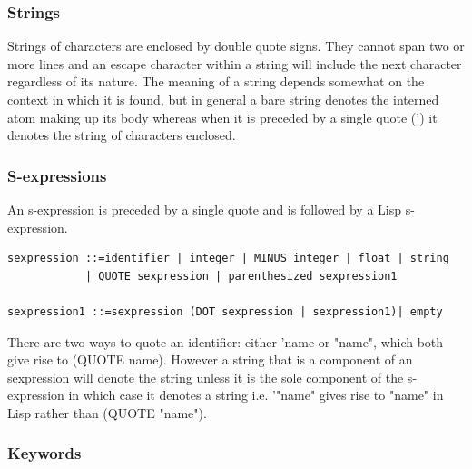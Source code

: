 \documentclass{article}
\begin{document}
\subsubsection{Strings}
\label{sec:boot:string}

Strings of characters are enclosed by double quote signs. They cannot
span two or more lines and an escape character within a string will
include the next character regardless of its nature.
The meaning of a string depends somewhat on the context in which
it is found, but in general a bare string denotes the interned atom
making up its body whereas when it is preceded by a single quote (')
it denotes the string of characters enclosed.

\subsubsection{S-expressions}
\label{sec:boot:s-expression}

An s-expression is preceded by a single quote and is followed by
a Lisp s-expression.
\begin{verbatim}
sexpression ::=identifier | integer | MINUS integer | float | string
            | QUOTE sexpression | parenthesized sexpression1

sexpression1 ::=sexpression (DOT sexpression | sexpression1)| empty
\end{verbatim}

There are two ways to quote an identifier: either 'name or "name", which
both give rise to (QUOTE name). However a string that is a
component of an sexpression will denote the string unless it is the
sole component of the s-expression in which case it denotes a string
i.e. '"name" gives rise to "name" in Lisp rather than (QUOTE "name").


\subsubsection{Keywords}
\label{sec:boot:keyword}
\end{document}
